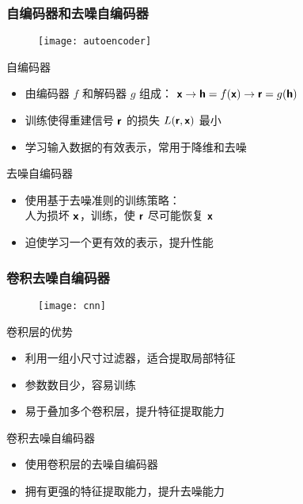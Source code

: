 \documentclass{beamer}
\begin{document}
\begin{frame}[subsec]
  \frametitle{自编码器和去噪自编码器}
  \begin{figure}
    \centering
    \texttt{[image: autoencoder]}
  \end{figure}

  \begin{alertblock}{自编码器}
    \vspace{-0.5ex}
    \begin{itemize}
      \item 由编码器 $f$ 和解码器 $g$ 组成：
        $\bm{\mathsf{x}} \rightarrow \bm{\mathsf{h}} = f(\bm{\mathsf{x}}) \rightarrow \bm{\mathsf{r}} = g(\bm{\mathsf{h}})$
      \item 训练使得重建信号 $\bm{\mathsf{r}}$ 的损失 $L(\bm{\mathsf{r}}, \bm{\mathsf{x}})$ 最小
      \item 学习输入数据的有效表示，常用于降维和去噪
    \end{itemize}
  \end{alertblock}

  \begin{alertblock}{去噪自编码器}
    \vspace{-0.5ex}
    \begin{itemize}
      \item 使用基于\alert{去噪准则}的训练策略：\\
        人为损坏 $\bm{\mathsf{x}}$，训练，使 $\bm{\mathsf{r}}$ 尽可能恢复 $\bm{\mathsf{x}}$
      \item 迫使学习一个更有效的表示，提升性能
    \end{itemize}
  \end{alertblock}
\end{frame}

\begin{frame}[subsec]
  \frametitle{卷积去噪自编码器}
  \begin{figure}
    \centering
    \texttt{[image: cnn]}
  \end{figure}

  \begin{alertblock}{卷积层的优势}
    \begin{itemize}
      \item 利用一组小尺寸过滤器，适合提取局部特征
      \item 参数数目少，容易训练
      \item 易于叠加多个卷积层，提升特征提取能力
    \end{itemize}
  \end{alertblock}

  \begin{alertblock}{卷积去噪自编码器}
    \vspace{-0.5ex}
    \begin{itemize}
      \item 使用卷积层的去噪自编码器
      \item 拥有更强的特征提取能力，提升去噪能力
    \end{itemize}
  \end{alertblock}
\end{frame}
\end{document}
